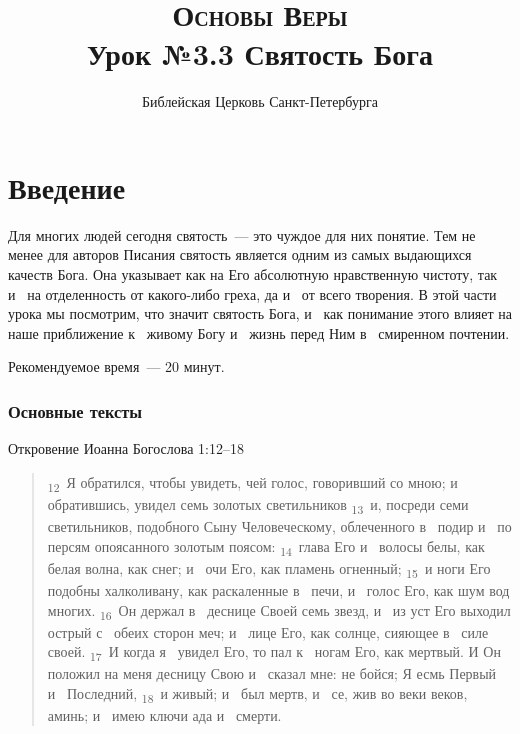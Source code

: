 \documentclass[a4paper,12pt]{article}
\title{\textsc{Основы Веры}\\Урок №3.3 Святость Бога}
\author{Библейская Церковь Санкт-Петербурга}
\date{}
\begin{document}
\maketitle

\thispagestyle{empty}

\tableofcontents



\section*{Введение}

Для многих людей сегодня святость~--- это чуждое для них понятие. Тем не менее для авторов Писания святость является одним из самых выдающихся качеств Бога. Она указывает как на Его абсолютную нравственную чистоту, так и~ на отделенность от какого-либо греха, да и~ от всего творения. В этой части урока мы посмотрим, что значит святость Бога, и~ как понимание этого влияет на наше приближение к~ живому Богу и~ жизнь перед Ним в~ смиренном почтении.

Рекомендуемое время~--- 20 минут.
        
\subsubsection*{Основные тексты}

\noindent Откровение Иоанна Богослова 1:12--18

\begin{quote}
\textsubscript{12}~Я обратился, чтобы увидеть, чей голос, говоривший со мною; и~ обратившись, увидел семь золотых светильников 
\textsubscript{13}~и, посреди семи светильников, подобного Сыну Человеческому, облеченного в~ подир и~ по персям опоясанного золотым поясом: 
\textsubscript{14}~глава Его и~ волосы белы, как белая волна, как снег; и~ очи Его, как пламень огненный; 
\textsubscript{15}~и ноги Его подобны халколивану, как раскаленные в~ печи, и~ голос Его, как шум вод многих. 
\textsubscript{16}~Он держал в~ деснице Своей семь звезд, и~ из уст Его выходил острый с~ обеих сторон меч; и~ лице Его, как солнце, сияющее в~ силе своей. 
\textsubscript{17}~И когда я~ увидел Его, то пал к~ ногам Его, как мертвый. И Он положил на меня десницу Свою и~ сказал мне: не бойся; Я есмь Первый и~ Последний, 
\textsubscript{18}~и живый; и~ был мертв, и~ се, жив во веки веков, аминь; и~ имею ключи ада и~ смерти. 

\end{quote}
\end{document}
